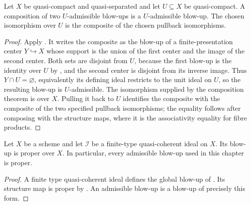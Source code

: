 \begin{lemma}
  \label{lemma:nagata-admissible-blowup-comp}
  \leanok

  Let $X$ be quasi-compact and quasi-separated and let $U\subseteq X$ be
  quasi-compact.  A composition of two $U$-admissible blow-ups is a
  $U$-admissible blow-up.  The chosen isomorphism over $U$ is the composite of
  the chosen pullback isomorphisms.
\end{lemma}

\begin{proof}
  \leanok
  Apply .  It writes the composite as
  the blow-up of a finite-presentation center $Y\hookrightarrow X$ whose
  support is the union of the first center and the image of the second center.
  Both sets are disjoint from $U$, because the first blow-up is the identity
  over $U$ by , and the second
  center is disjoint from its inverse image.  Thus $Y\cap U=\varnothing$,
  equivalently its defining ideal restricts to the unit ideal on $U$, so the
  resulting blow-up is $U$-admissible.  The isomorphism supplied by the
  composition theorem is over $X$.  Pulling it back to $U$ identifies the
  composite with the composite of the two specified pullback isomorphisms;
  the equality follows after composing with the structure maps, where it is
  the associativity equality for fibre products.
\end{proof}

\begin{lemma}
  \label{lemma:nagata-blowup-proper}
  \leanok

  Let $X$ be a scheme and let $\mathcal I$ be a finite-type quasi-coherent
  ideal on $X$.  Its blow-up is proper over $X$.  In particular,
  every admissible blow-up used in this chapter is proper.
\end{lemma}

\begin{proof}
  \leanok
  A finite type quasi-coherent ideal defines the global blow-up of
  .  Its structure map is proper by
  .  An admissible blow-up is a blow-up
  of precisely this form.
\end{proof}

